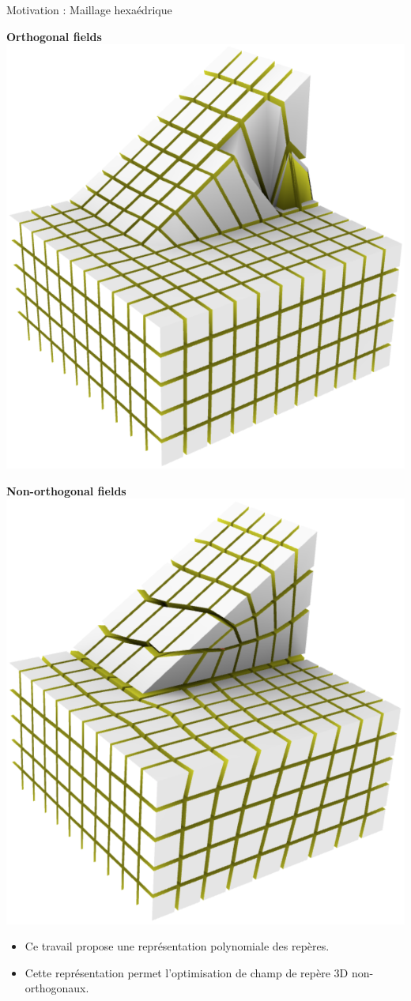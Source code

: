 \begin{frame}{Motivation : Maillage hexaédrique}
    \centering
    
    \begin{minipage}[c]{0.48\textwidth}
    \centering 
    \textbf{Orthogonal fields}\\
    \vspace{0.3cm}
    \includegraphics[width=.7\linewidth]{img_spm_ff/slope_ortho_front.png}
    \end{minipage}%
    \hfill\vline\hfill
    \begin{minipage}[c]{0.48\textwidth}
    \centering 
    \textbf{Non-orthogonal fields}\\
    \vspace{0.3cm}
    \includegraphics[width=.7\linewidth]{img_spm_ff/slope_northo_front.png}
    \end{minipage}
    
    \vspace*{0.3cm}
    \begin{itemize}
        \item Ce travail propose une représentation polynomiale des repères.
        \item Cette représentation permet l'optimisation de champ de repère 3D non-orthogonaux.
    \end{itemize}
    
\end{frame}

